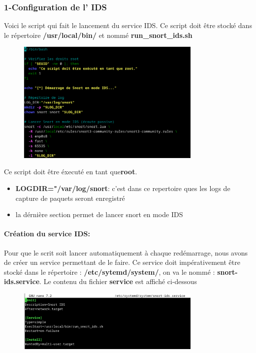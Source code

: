 \documentclass[12pt]{article}
\begin{document}
\subsubsection*{1-Configuration de l' IDS}
Voici le script qui fait le lancement du service IDS. Ce script doit être stocké dans le répertoire \textbf{/usr/local/bin/} et nommé \textbf{run\_snort\_ids.sh}
\begin{figure}[H] %
    \centering
    \includegraphics[width=0.8\textwidth]{captures/image1.png}
    \label{fig:mon_image}
\end{figure}
Ce script doit être éxecuté en tant que\textbf{root}.\\
\begin{itemize}
    \item \textbf{LOGDIR="/var/log/snort}: c'est dans ce repertoire ques les logs de capture de paquets seront enregistré
    \item la dérnière section permet de lancer snort en mode IDS
\end{itemize}

\paragraph{Création du service IDS:}
Pour que le scrit soit lancer automatiquement à chaque redémarrage, nous avons de créer un service permettant de le faire. Ce service doit impérativement être stocké dans le répertoire : \textbf{/etc/sytemd/system/}, on va le nommé : \textbf{snort-ids.service}. Le contenu du fichier \textbf{service} est affiché ci-dessous
\begin{figure}[H] 
    \centering
    \includegraphics[width=0.8\textwidth]{captures/image3.png}
    \label{fig:mon_image}
\end{figure}
\end{document}
